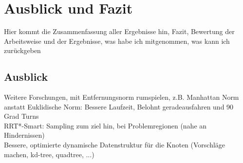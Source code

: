 \section{Ausblick und Fazit}
\label{sec:Zusammenfassung}
Hier kommt die Zusammenfassung aller Ergebnisse hin, Fazit, Bewertung der Arbeitsweise und der Ergebnisse, was habe ich mitgenommen, was kann ich zurückgeben

\subsection{Ausblick}
Weitere Forschungen, mit Entfernungsnorm rumspielen, z.B. Manhattan Norm anstatt Euklidische Norm: Bessere Laufzeit, Belohnt geradeausfahren und 90 Grad Turns \\
RRT*-Smart: Sampling zum ziel hin, bei Problemregionen (nahe an Hindernissen) \\
Bessere, optimierte dynamische Datenstruktur für die Knoten (Vorschläge machen, kd-tree, quadtree, ...)\\
